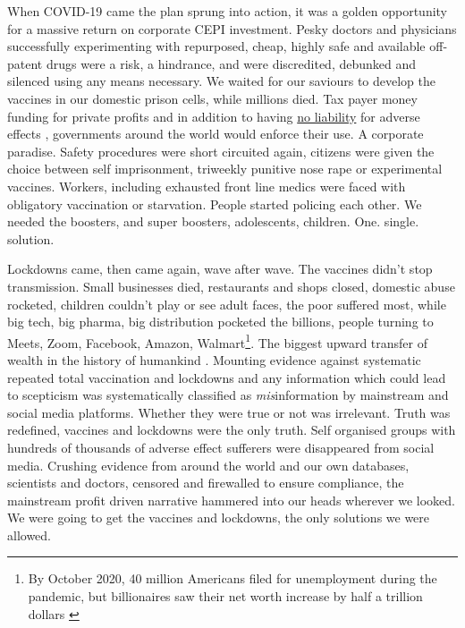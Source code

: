 \documentclass[11pt,a4paper,notitlepage]{report}
\begin{document}
When COVID-19 came the plan sprung into action, it was a golden opportunity for a massive return on corporate CEPI investment. Pesky doctors and physicians successfully experimenting with repurposed, cheap, highly safe and available off-patent drugs were a risk, a hindrance, and were discredited, debunked and silenced using any means necessary. We waited for our saviours to develop the vaccines in our domestic prison cells, while millions died. Tax payer money funding for private profits and in addition to having \href{https://www.cnbc.com/2020/12/16/covid-vaccine-side-effects-compensation-lawsuit.html}{no liability} for adverse effects \cite{cnbc17122020}, governments around the world would enforce their use. A corporate paradise. Safety procedures were short circuited again, citizens were given the choice between self imprisonment, triweekly punitive nose rape or experimental vaccines. Workers, including exhausted front line medics were faced with obligatory vaccination or starvation. People started policing each other. We needed the boosters, and super boosters, adolescents, children. One. single. solution.

Lockdowns came, then came again, wave after wave. The vaccines didn't stop transmission. Small businesses died, restaurants and shops closed, domestic abuse rocketed, children couldn't play or see adult faces, the poor suffered most, while big tech, big pharma, big distribution pocketed the billions, people turning to Meets, Zoom, Facebook, Amazon, Walmart\footnote{By October 2020, 40 million Americans filed for unemployment during the pandemic, but billionaires saw their net worth increase by half a trillion dollars \cite{businessinsider30102020}}. The biggest upward transfer of wealth in the history of humankind \cite{oxfam17012022}. Mounting evidence against systematic repeated total vaccination and lockdowns and any information which could lead to scepticism was systematically classified as \textit{mis}information by mainstream and social media platforms. Whether they were true or not was irrelevant. Truth was redefined, vaccines and lockdowns were the only truth. Self organised groups with hundreds of thousands of adverse effect sufferers were disappeared from social media. Crushing evidence from around the world and our own databases, scientists and doctors, censored and firewalled to ensure compliance, the mainstream profit driven narrative hammered into our heads wherever we looked. We were going to get the vaccines and lockdowns, the only solutions we were allowed.
\end{document}
